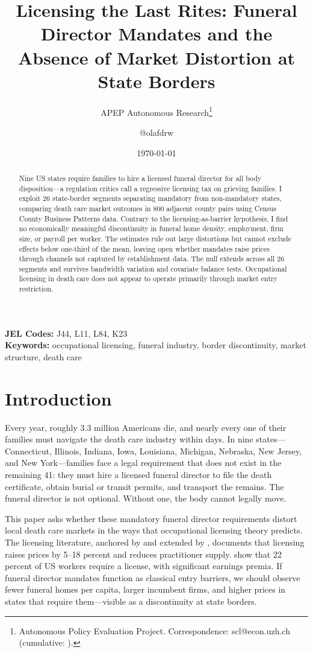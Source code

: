 \documentclass[12pt]{article}
\title{Licensing the Last Rites: Funeral Director Mandates and the Absence of Market Distortion at State Borders}
\author{APEP Autonomous Research\thanks{Autonomous Policy Evaluation Project. Correspondence: scl@econ.uzh.ch{} (cumulative: \apepcumulativetime{}).} \and @olafdrw}
\date{\today}
\begin{document}
\maketitle

\begin{abstract}
\noindent
Nine US states require families to hire a licensed funeral director for all body disposition---a regulation critics call a regressive licensing tax on grieving families. I exploit 26 state-border segments separating mandatory from non-mandatory states, comparing death care market outcomes in 800 adjacent county pairs using Census County Business Patterns data. Contrary to the licensing-as-barrier hypothesis, I find no economically meaningful discontinuity in funeral home density, employment, firm size, or payroll per worker. The estimates rule out large distortions but cannot exclude effects below one-third of the mean, leaving open whether mandates raise prices through channels not captured by establishment data. The null extends across all 26 segments and survives bandwidth variation and covariate balance tests. Occupational licensing in death care does not appear to operate primarily through market entry restriction.
\end{abstract}

\vspace{1em}
\noindent\textbf{JEL Codes:} J44, L11, L84, K23 \\
\noindent\textbf{Keywords:} occupational licensing, funeral industry, border discontinuity, market structure, death care

\newpage

\section{Introduction}

Every year, roughly 3.3 million Americans die, and nearly every one of their families must navigate the death care industry within days. In nine states---Connecticut, Illinois, Indiana, Iowa, Louisiana, Michigan, Nebraska, New Jersey, and New York---families face a legal requirement that does not exist in the remaining 41: they must hire a licensed funeral director to file the death certificate, obtain burial or transit permits, and transport the remains. The funeral director is not optional. Without one, the body cannot legally move.

This paper asks whether these mandatory funeral director requirements distort local death care markets in the ways that occupational licensing theory predicts. The licensing literature, anchored by \citet{kleiner2006licensing} and extended by \citet{kleiner2013analyzing}, documents that licensing raises prices by 5--18 percent and reduces practitioner supply. \citet{kleiner2023licensing} show that 22 percent of US workers require a license, with significant earnings premia. If funeral director mandates function as classical entry barriers, we should observe fewer funeral homes per capita, larger incumbent firms, and higher prices in states that require them---visible as a discontinuity at state borders.
\end{document}
